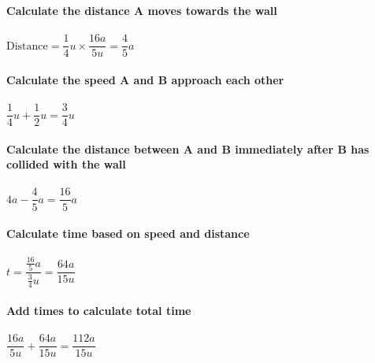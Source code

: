 \documentclass{article}[18pt]
\begin{document}
\textbf{Calculate the distance A moves towards the wall}\\
\\
$\text{Distance}=\dfrac{1}{4}u\times\dfrac{16a}{5u}=\dfrac{4}{5}a$\\
\\
\textbf{Calculate the speed A and B approach each other}\\
\\
$\dfrac{1}{4}u+\dfrac{1}{2}u=\dfrac{3}{4}u$\\
\\
\textbf{Calculate the distance between A and B immediately after B has collided with the wall}\\
\\
$4a-\dfrac{4}{5}a=\dfrac{16}{5}a$\\
\\
\textbf{Calculate time based on speed and distance}\\
\\
$t=\dfrac{\frac{16}{5}a}{\frac{3}{4}u}=\dfrac{64a}{15u}$\\
\\
\textbf{Add times to calculate total time}\\
\\
$\dfrac{16a}{5u}+\dfrac{64a}{15u}=\dfrac{112a}{15u}$
\end{document}
